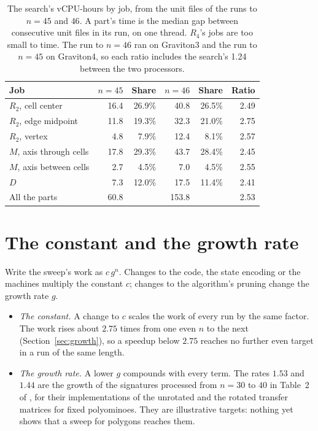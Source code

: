 \documentclass[11pt]{a000104}
\numberwithin{equation}{section}
\begin{document}
\begin{table}[!htbp]
  \centering
  \begin{tabular}{lrrrrr}
    \toprule
    Job & $n = 45$ & Share & $n = 46$ & Share & Ratio \\
    \midrule
    $R_2$, cell center & 16.4 & 26.9\% & 40.8 & 26.5\% & 2.49 \\
    $R_2$, edge midpoint & 11.8 & 19.3\% & 32.3 & 21.0\% & 2.75 \\
    $R_2$, vertex & 4.8 & 7.9\% & 12.4 & 8.1\% & 2.57 \\
    $M$, axis through cells & 17.8 & 29.3\% & 43.7 & 28.4\% & 2.45 \\
    $M$, axis between cells & 2.7 & 4.5\% & 7.0 & 4.5\% & 2.55 \\
    $D$ & 7.3 & 12.0\% & 17.5 & 11.4\% & 2.41 \\
    All the parts & 60.8 & & 153.8 & & 2.53 \\
    \bottomrule
  \end{tabular}
  \caption{The search's vCPU-hours by job, from the unit files of the runs to $n = 45$ and $46$. A part's time is the median gap between consecutive unit files in its run, on one thread. $R_4$'s jobs are too small to time. The run to $n = 46$ ran on Graviton3 and the run to $n = 45$ on Graviton4, so each ratio includes the search's 1.24 between the two processors.}
  \label{tab:jobs}
\end{table}

\section{The constant and the growth rate}\label{sec:slope}

Write the sweep's work as $c\,g^n$.
Changes to the code, the state encoding or the machines multiply the constant $c$; changes to the algorithm's pruning change the growth rate $g$.
\begin{itemize}
  \item \emph{The constant.} A change to $c$ scales the work of every run by the same factor. The work rises about $2.75$ times from one even $n$ to the next (Section~\ref{sec:growth}), so a speedup below $2.75$ reaches no further even target in a run of the same length.
  \item \emph{The growth rate.} A lower $g$ compounds with every term. The rates $1.53$ and $1.44$ are the growth of the signatures processed from $n = 30$ to $40$ in Table~2 of \textcite{BarequetBenShachar:2026}, for their implementations of the unrotated and the rotated transfer matrices for fixed polyominoes. They are illustrative targets: nothing yet shows that a sweep for polygons reaches them.
\end{itemize}
\end{document}
